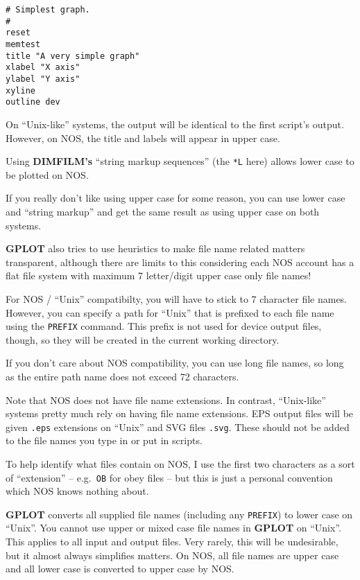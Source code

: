 \documentclass[a4paper,twoside,11pt]{article}
\newcommand{\newpara}{\par\vspace{4mm}\noindent}
\begin{document}
\begin{lstlisting}
# Simplest graph.
#
reset
memtest
title "A very simple graph"
xlabel "X axis"
ylabel "Y axis"
xyline
outline dev
\end{lstlisting}

\newpara
On ``Unix-like'' systems, the output will be identical to the first
script's output. However, on NOS, the title and labels will appear in
upper case.

\newpara
Using \textbf{DIMFILM's} ``string markup sequences'' (the \texttt{*L} here)
allows lower case to be plotted on NOS.

\newpara
If you really don't like using upper case for some reason, you can use
lower case and ``string markup'' and get the same result as using upper
case on both systems.

\newpara
\textbf{GPLOT} also tries to use heuristics to make file name related matters
transparent, although there are limits to this considering each NOS
account has a flat file system with maximum 7 letter/digit upper case
only file names!

\newpara
For NOS / ``Unix'' compatibilty, you will have to stick to 7 character
file names. However, you can specify a path for ``Unix'' that is
prefixed to each file name using the \texttt{PREFIX} command. This
prefix is not used for device output files, though, so they will be
created in the current working directory.

\newpara
If you don't care about NOS compatibility, you can use long file names,
so long as the entire path name does not exceed 72 characters.

\newpara
Note that NOS does not have file name extensions. In contrast,
``Unix-like'' systems pretty much rely on having file name extensions.
EPS output files will be given \texttt{.eps} extensions on ``Unix'' and
SVG files \texttt{.svg}. These should not be added to the file names you
type in or put in scripts.

\newpara
To help identify what files contain on NOS, I use the first two
characters as a sort of ``extension'' -- e.g.~\texttt{OB} for obey files
-- but this is just a personal convention which NOS knows nothing about.

\newpara
\textbf{GPLOT} converts all supplied file names (including any \texttt{PREFIX})
to lower case on ``Unix''. You cannot use upper or mixed case file names
in \textbf{GPLOT} on ``Unix''. This applies to all input and output files. Very
rarely, this will be undesirable, but it almost always simplifies
matters. On NOS, all file names are upper case and all lower case is
converted to upper case by NOS.
\end{document}
